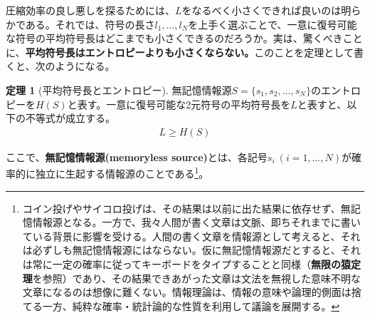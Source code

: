 \documentclass[uplatex,dvipdfmx,b5j,10pt]{jsbook}
\theoremstyle{definition}
\newtheorem{theorem}{定理}
\begin{document}
圧縮効率の良し悪しを探るためには、$L$をなるべく小さくできれば良いのは明らかである。それでは、符号の長さ$l_{1},\dots,l_{N}$を上手く選ぶことで、一意に復号可能な符号の平均符号長はどこまでも小さくできるのだろうか。実は、驚くべきことに、\textbf{平均符号長はエントロピーよりも小さくならない。}このことを定理として書くと、次のようになる。

\begin{theorem}[平均符号長とエントロピー]\label{min_of_mean_of_code_length}
  無記憶情報源$S = \{ s_{1}, s_{2}, \dots, s_{N} \}$のエントロピーを$H(S)$と表す。一意に復号可能な2元符号の平均符号長を$L$と表すと、以下の不等式が成立する。
  \begin{eqnarray} \label{entropy_and_mean_of_code_length}
    L \geq H(S)
  \end{eqnarray}
\end{theorem}

ここで、\textbf{無記憶情報源(memoryless source)}とは、各記号$s_{i}\ (i=1,\dots,N)$が確率的に独立に生起する情報源のことである\footnote{コイン投げやサイコロ投げは、その結果は以前に出た結果に依存せず、無記憶情報源となる。一方で、我々人間が書く文章は文脈、即ちそれまでに書いている背景に影響を受ける。人間の書く文章を情報源として考えると、それは必ずしも無記憶情報源にはならない。仮に無記憶情報源だとすると、それは常に一定の確率に従ってキーボードをタイプすることと同様（\textbf{無限の猿定理}を参照）であり、その結果できあがった文章は文法を無視した意味不明な文章になるのは想像に難くない。情報理論は、情報の意味や論理的側面は捨てる一方、純粋な確率・統計論的な性質を利用して議論を展開する\cite{amariinfo}。}。
\end{document}
